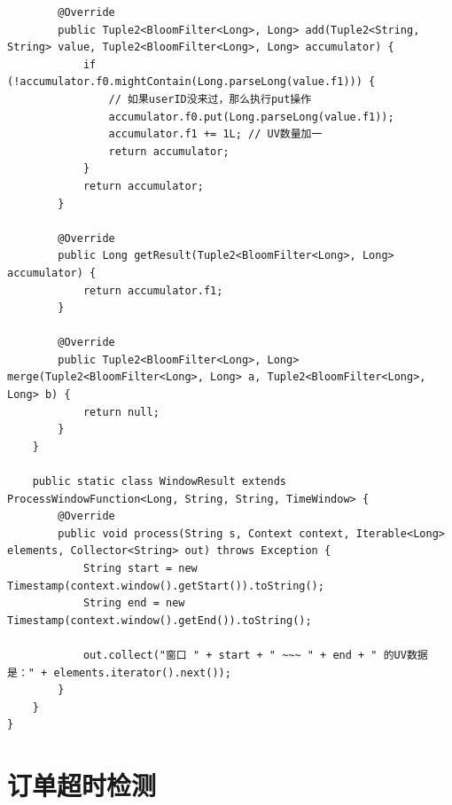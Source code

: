 \documentclass[cn,11pt,chinese]{elegantbook}
\begin{document}
\begin{verbatim}
        @Override
        public Tuple2<BloomFilter<Long>, Long> add(Tuple2<String, String> value, Tuple2<BloomFilter<Long>, Long> accumulator) {
            if (!accumulator.f0.mightContain(Long.parseLong(value.f1))) {
                // 如果userID没来过，那么执行put操作
                accumulator.f0.put(Long.parseLong(value.f1));
                accumulator.f1 += 1L; // UV数量加一
                return accumulator;
            }
            return accumulator;
        }

        @Override
        public Long getResult(Tuple2<BloomFilter<Long>, Long> accumulator) {
            return accumulator.f1;
        }

        @Override
        public Tuple2<BloomFilter<Long>, Long> merge(Tuple2<BloomFilter<Long>, Long> a, Tuple2<BloomFilter<Long>, Long> b) {
            return null;
        }
    }

    public static class WindowResult extends ProcessWindowFunction<Long, String, String, TimeWindow> {
        @Override
        public void process(String s, Context context, Iterable<Long> elements, Collector<String> out) throws Exception {
            String start = new Timestamp(context.window().getStart()).toString();
            String end = new Timestamp(context.window().getEnd()).toString();

            out.collect("窗口 " + start + " ~~~ " + end + " 的UV数据是：" + elements.iterator().next());
        }
    }
}
\end{verbatim}

\section{订单超时检测}
\end{document}
